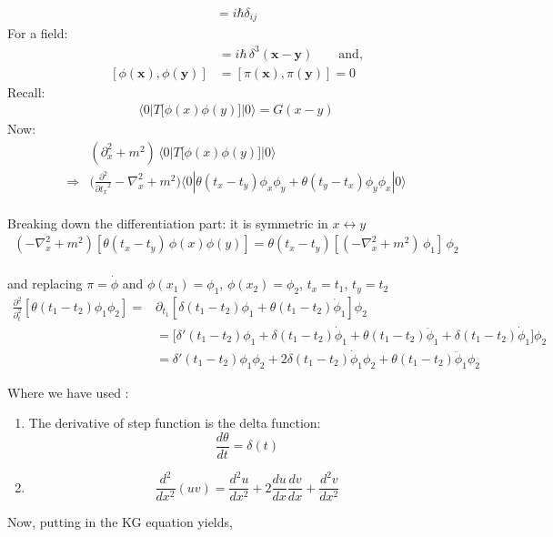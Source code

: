 \documentclass[14pt]{article} %
\begin{document}
{\begin{align*}
[x_i(t), p_j(t)] = i \hbar \delta_{ij}
\end{align*}
For a field:
\begin{align*}
[\phi(\mathbf{x}),\pi(\mathbf{y})] &= i \hbar \, \delta^3(\mathbf{x} - \mathbf{y}) \qquad \text{and,}
\\
[\phi(\mathbf{x}), \phi(\mathbf{y})] &= [\pi(\mathbf{x}), \pi(\mathbf{y})] = 0
\end{align*}
Recall:
\begin{align*}
\langle 0 | T \big[ \phi(x) \phi(y) \big] | 0 \rangle = G(x-y)
\end{align*}
Now:
\begin{align*}
& (\partial_x^2 + m^2) \, \langle 0 | T \big[ \phi(x) \phi(y) \big] | 0 \rangle
\\
\Rightarrow & \big( \frac{\partial^2}{\partial {t_x}^{2}} -\nabla_x^2 + m^2 \big) \langle 0 |\theta (t_x - t_y ) \phi_x \phi_y + \theta (t_y - t_x ) \phi_y \phi_x | 0 \rangle
\end{align*} \\ 
Breaking down the differentiation part: it is symmetric in $x \leftrightarrow y$
\begin{align*}
(-\nabla_x ^2 + m^2) [\theta (t_x - t_y) \, \phi(x) \phi(y)] =\theta (t_x - t_y)[(-\nabla_x ^2 + m^2)\,\phi_1]\, \phi_2 
\end{align*} \\ 
and replacing $\pi = \dot{\phi}$ and $\phi(x_1) = \phi_1$, $\phi(x_2) = \phi_2$, $t_x = t_1$, $t_y = t_2$
\begin{align*}
\frac{\partial^2}{\partial_t ^2} [ \theta(t_1 -t_2) \phi_1 \phi_2 ]
= &\partial_{t_1} \left[ \delta(t_1 - t_2) \phi_1 + \theta(t_1 - t_2) \dot{\phi}_1 \right] \phi_2 \\
&= \big[ \delta'(t_1 - t_2) \phi_1 + \delta(t_1 - t_2) \dot{\phi}_1 + \theta(t_1 - t_2) \ddot{\phi}_1 + \delta (t_1 - t_2) \dot{\phi}_1 \big] \phi_2
\\ 
&= \delta'(t_1 - t_2) \phi_1 \phi_2 + 2\delta(t_1 - t_2) \dot{\phi}_1 \phi_2 + \theta(t_1 - t_2) \ddot{\phi}_1 \phi_2
\end{align*}

Where we have used :
\begin{enumerate}
\item The derivative of step function is the delta function:
\[
\frac{d \theta}{dt} = \delta(t)
\]
\item 
\[
\frac{d^2}{dx^2}(uv) = \frac{d^2u}{dx^2} +2 \frac{du}{dx}\frac{dv}{dx} + \frac{d^2 v}{dx^2} 
\]
\end{enumerate}
Now, putting in the KG equation yields,
} \\
\end{document}
